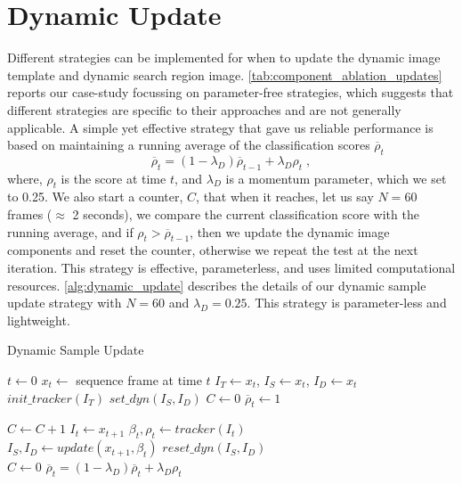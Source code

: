 \section{Dynamic Update} \label{sec:methods_update} 
Different strategies can be implemented for when to update the dynamic image template and dynamic search region image. \ref{tab:component_ablation_updates} reports our case-study focussing on parameter-free strategies, which suggests that different strategies are specific to their approaches and are not generally applicable. A simple yet effective strategy that gave us reliable performance is based on maintaining a running average of the classification scores $\overline{\rho }_t$
\begin{equation}
  \label{eq:sample_update}
          \overline{\rho }_t = (1-{\lambda}_{D}) \overline{\rho}_{t-1} +  {\lambda}_{D} {\rho}_t \; ,
\end{equation}
where, ${\rho}_t$ is the score at time $t$, and ${\lambda}_{D}$ is a momentum parameter, which we set to 0.25. We also start a counter, $C$, that when it reaches, let us say $N=60$ frames ($\approx$ 2 seconds), we compare the current classification score with the running average, and if ${\rho}_t > \overline{\rho }_{t-1}$, then we update the dynamic image components and reset the counter, otherwise we repeat the test at the next iteration. This strategy is effective, parameterless, and uses limited computational resources. \ref{alg:dynamic_update} describes the details of our dynamic sample update strategy with $N=60$ and ${\lambda}_{D} = 0.25$. This strategy is parameter-less and lightweight.

\begin{algorithm}
  \centering
  \caption{Dynamic Sample Update}\label{alg:dynamic_update}
  \begin{algorithmic}
    \State $t \gets 0$
    \State $x_t \gets $ sequence frame at time $t$
    \State $I_T \gets x_t$, $I_S \gets x_t$, $I_D \gets x_t$
    \State $init\_tracker(I_T)$ 
    \State $set\_dyn(I_S, I_D)$ 
    \State $C \gets 0$ 
    \State $\overline{\rho}_t \gets 1$ 
  
      \State $C \gets C+1$ 
      \State $I_t \gets x_{t+1}$  
      \State ${\beta}_t, {\rho}_t \gets tracker(I_t)$ 
      \State {}
        \\ 
            \State $I_S, I_D \gets update(x_{t+1}, {\beta}_t)$ %
            \State $reset\_dyn(I_S, I_D)$ \\ 
            \State $C \gets 0$
      \EndIf 
      \State $\overline{\rho }_t = (1-{\lambda}_{D}) \overline{\rho}_{t} +  {\lambda}_{D} {\rho}_t$ \\ 
      \EndWhile
  \end{algorithmic}
\end{algorithm}


